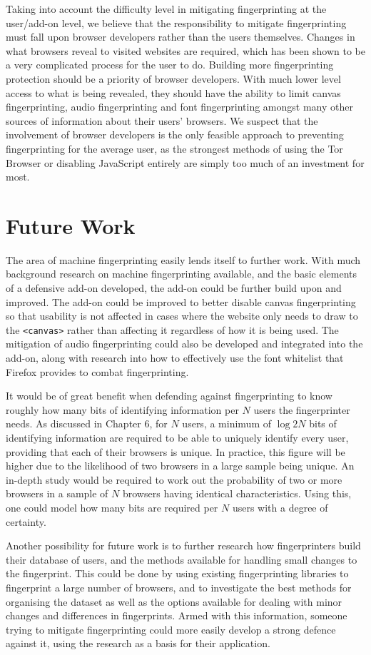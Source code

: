 Taking into account the difficulty level in mitigating fingerprinting at the user/add-on level, we believe that the responsibility to mitigate fingerprinting must fall upon browser developers rather than the users themselves.
Changes in what browsers reveal to visited websites are required, which has been shown to be a very complicated process for the user to do.
Building more fingerprinting protection should be a priority of browser developers.
With much lower level access to what is being revealed, they should have the ability to limit canvas fingerprinting, audio fingerprinting and font fingerprinting amongst many other sources of information about their users' browsers.
We suspect that the involvement of browser developers is the only feasible approach to preventing fingerprinting for the average user, as the strongest methods of using the Tor Browser or disabling JavaScript entirely are simply too much of an investment for most.

\section{Future Work}

The area of machine fingerprinting easily lends itself to further work.
With much background research on machine fingerprinting available, and the basic elements of a defensive add-on developed, the add-on could be further build upon and improved.
The add-on could be improved to better disable canvas fingerprinting so that usability is not affected in cases where the website only needs to draw to the \texttt{<canvas>} rather than affecting it regardless of how it is being used.
The mitigation of audio fingerprinting could also be developed and integrated into the add-on, along with research into how to effectively use the font whitelist that Firefox provides to combat fingerprinting.

It would be of great benefit when defending against fingerprinting to know roughly how many bits of identifying information per $N$ users the fingerprinter needs.
As discussed in Chapter 6, for $N$ users, a minimum of $\log{2}N$ bits of identifying information are required to be able to uniquely identify every user, providing that each of their browsers is unique.
In practice, this figure will be higher due to the likelihood of two browsers in a large sample being unique.
An in-depth study would be required to work out the probability of two or more browsers in a sample of $N$ browsers having identical characteristics.
Using this, one could model how many bits are required per $N$ users with a degree of certainty.

Another possibility for future work is to further research how fingerprinters build their database of users, and the methods available for handling small changes to the fingerprint.
This could be done by using existing fingerprinting libraries to fingerprint a large number of browsers, and to investigate the best methods for organising the dataset as well as the options available for dealing with minor changes and differences in fingerprints.
Armed with this information, someone trying to mitigate fingerprinting could more easily develop a strong defence against it, using the research as a basis for their application.


